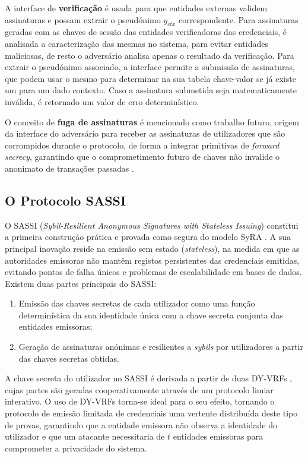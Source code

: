 A interface de \textbf{verificação} é usada para que entidades externas validem assinaturas e possam extrair o pseudónimo $y_{ctx}$ correspondente. Para assinaturas geradas com as chaves de sessão das entidades verificadoras das credenciais, é analisada a caracterização das mesmas no sistema, para evitar entidades maliciosas, de resto o adversário analisa apenas o resultado da verificação. Para extrair o pseudónimo associado, a interface permite a submissão de assinaturas, que podem usar o mesmo para determinar na sua tabela chave-valor se já existe um para um dado contexto. Caso a assinatura submetida seja matematicamente inválida, é retornado um valor de erro determinístico.

O conceito de \textbf{fuga de assinaturas} é mencionado \cite{crites2025syra} como trabalho futuro, origem da interface do adversário para receber as assinaturas de utilizadores que são corrompidos durante o protocolo, de forma a integrar primitivas de \textit{forward secrecy}, garantindo que o comprometimento futuro de chaves não invalide o anonimato de transações passadas \cite{david2024musen}.

\subsection{O Protocolo SASSI}

O SASSI (\textit{Sybil-Resilient Anonymous Signatures with Stateless Issuing}) constitui a primeira construção prática e provada como segura do modelo SyRA \cite{crites2025syra}. A sua principal inovação reside na emissão sem estado (\textit{stateless}), na medida em que as autoridades emissoras não mantêm registos persistentes das credenciais emitidas, evitando pontos de falha únicos e problemas de escalabilidade em bases de dados. Existem duas partes principais do SASSI:

\begin{enumerate}
    \item Emissão das chaves secretas de cada utilizador como uma função determinística da sua identidade única com a chave secreta conjunta das entidades emissoras;
    \item Geração de assinaturas anónimas e resilientes a \textit{sybils} por utilizadores a partir das chaves secretas obtidas.
\end{enumerate}

A chave secreta do utilizador no SASSI é derivada a partir de duas DY-VRFs \cite{dodis2005verifiable}, cujas partes são geradas cooperativamente através de um protocolo limiar interativo. O uso de DY-VRFs torna-se ideal para o seu efeito, tornando o protocolo de emissão limitada de credenciais uma vertente distribuída deste tipo de provas, garantindo que a entidade emissora não observa a identidade do utilizador e que um atacante necessitaria de $t$ entidades emissoras para comprometer a privacidade do sistema.

